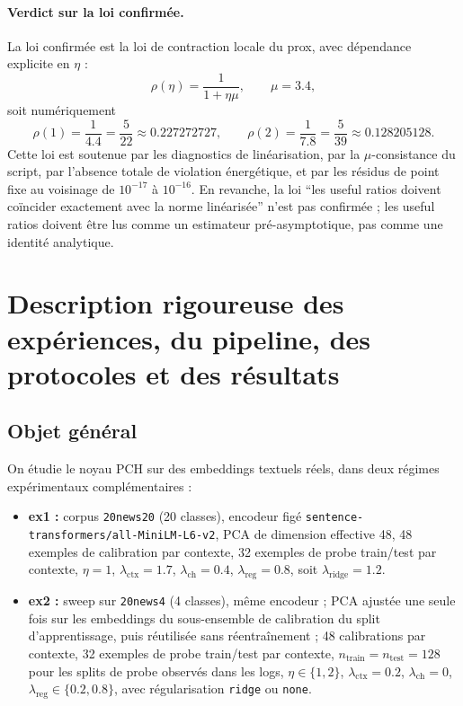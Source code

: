 \paragraph{Verdict sur la loi confirmée.}
La loi confirmée est la loi de contraction locale du prox, avec dépendance explicite en \(\eta\) :
\[
\rho(\eta)=\frac{1}{1+\eta\mu},
\qquad
\mu=3.4,
\]
soit numériquement
\[
\rho(1)=\frac{1}{4.4}=\frac{5}{22}\approx 0.227272727,
\qquad
\rho(2)=\frac{1}{7.8}=\frac{5}{39}\approx 0.128205128.
\]
Cette loi est soutenue par les diagnostics de linéarisation, par la \(\mu\)-consistance du script, par l’absence totale de violation énergétique, et par les résidus de point fixe au voisinage de \(10^{-17}\) à \(10^{-16}\). En revanche, la loi “les useful ratios doivent coïncider exactement avec la norme linéarisée” n’est pas confirmée ; les useful ratios doivent être lus comme un estimateur pré-asymptotique, pas comme une identité analytique.






\section{Description rigoureuse des expériences, du pipeline, des protocoles et des résultats}

\subsection{Objet général}

On étudie le noyau PCH sur des embeddings textuels réels, dans deux régimes expérimentaux complémentaires :

\begin{itemize}
    \item \textbf{ex1 :} corpus \texttt{20news20} (20 classes), encodeur figé \texttt{sentence-transformers/all-MiniLM-L6-v2}, PCA de dimension effective 48, 48 exemples de calibration par contexte, 32 exemples de probe train/test par contexte, \(\eta=1\), \(\lambda_{\mathrm{ctx}}=1.7\), \(\lambda_{\mathrm{ch}}=0.4\), \(\lambda_{\mathrm{reg}}=0.8\), soit \(\lambda_{\mathrm{ridge}}=1.2\).
    \item \textbf{ex2 :} sweep sur \texttt{20news4} (4 classes), même encodeur ; PCA ajustée une seule fois sur les embeddings du sous-ensemble de calibration du split d’apprentissage, puis réutilisée sans réentraînement ; 48 calibrations par contexte, 32 exemples de probe train/test par contexte, \(n_{\text{train}}=n_{\text{test}}=128\) pour les splits de probe observés dans les logs, \(\eta\in\{1,2\}\), \(\lambda_{\mathrm{ctx}}=0.2\), \(\lambda_{\mathrm{ch}}=0\), \(\lambda_{\mathrm{reg}}\in\{0.2,0.8\}\), avec régularisation \texttt{ridge} ou \texttt{none}.
\end{itemize}

